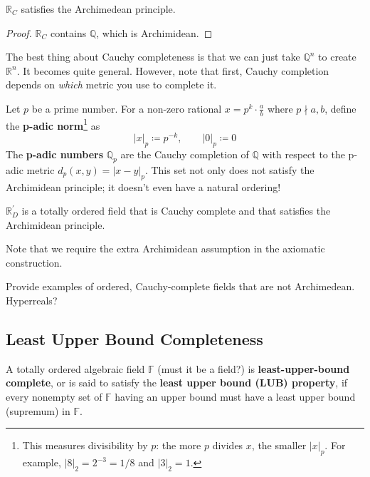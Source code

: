  \begin{theorem}
    $\mathbb{R}_C$ satisfies the Archimedean principle. 
  \end{theorem}
  \begin{proof}
    $\mathbb{R}_C$ contains $\mathbb{Q}$, which is Archimidean. 
  \end{proof}

  The best thing about Cauchy completeness is that we can just take $\mathbb{Q}^n$ to create $\mathbb{R}^n$. It becomes quite general. However, note that first, Cauchy completion depends on \textit{which} metric you use to complete it. 

  \begin{example}
    Let $p$ be a prime number. For a non-zero rational $x = p^k \cdot \frac{a}{b}$ where $p \nmid a, b$, define the \textbf{p-adic norm}\footnote{This measures divisibility by $p$: the more $p$ divides $x$, the smaller $|x|_p$. For example, $|8|_2 = 2^{-3} = 1/8$ and $|3|_2 = 1$.} as 
    \begin{equation}
      |x|_p \coloneqq p^{-k}, \qquad |0|_p \coloneqq 0
    \end{equation}
    The \textbf{p-adic numbers} $\mathbb{Q}_p$ are the Cauchy completion of $\mathbb{Q}$ with respect to the p-adic metric $d_p(x,y) = |x - y|_p$. This set not only does not satisfy the Archimidean principle; it doesn't even have a natural ordering! 
  \end{example} 

  \begin{definition}
    $\mathbb{R}_D^\prime$ is a totally ordered field that is Cauchy complete and that satisfies the Archimidean principle.
  \end{definition}

  Note that we require the extra Archimidean assumption in the axiomatic construction. 

  \begin{example}
    Provide examples of ordered, Cauchy-complete fields that are not Archimedean. Hyperreals? 
  \end{example}

\subsection{Least Upper Bound Completeness}

  \begin{definition}
    A totally ordered algebraic field $\mathbb{F}$ (must it be a field?) is \textbf{least-upper-bound complete}, or is said to satisfy the \textbf{least upper bound (LUB) property}, if every nonempty set of $\mathbb{F}$ having an upper bound must have a least upper bound (supremum) in $\mathbb{F}$. 
  \end{definition} 

